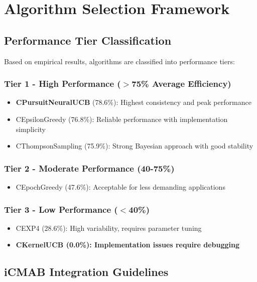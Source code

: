 \documentclass[12pt,a4paper]{article}
\newcommand{\primarytext}[1]{\textcolor{primaryblue}{\textbf{#1}}}
\newcommand{\warning}[1]{\textcolor{warningred}{\textbf{#1}}}
\begin{document}
\section{Algorithm Selection Framework}

\subsection{Performance Tier Classification}

Based on empirical results, algorithms are classified into performance tiers:

\subsubsection{Tier 1 - High Performance ($>$75\% Average Efficiency)}
\begin{itemize}
\item \primarytext{CPursuitNeuralUCB} (78.6\%): Highest consistency and peak performance
\item CEpsilonGreedy (76.8\%): Reliable performance with implementation simplicity
\item CThompsonSampling (75.9\%): Strong Bayesian approach with good stability
\end{itemize}

\subsubsection{Tier 2 - Moderate Performance (40-75\%)}
\begin{itemize}
\item CEpochGreedy (47.6\%): Acceptable for less demanding applications
\end{itemize}

\subsubsection{Tier 3 - Low Performance ($<$40\%)}
\begin{itemize}
\item CEXP4 (28.6\%): High variability, requires parameter tuning
\item \warning{CKernelUCB (0.0\%): Implementation issues require debugging}
\end{itemize}

\subsection{iCMAB Integration Guidelines}
\end{document}
